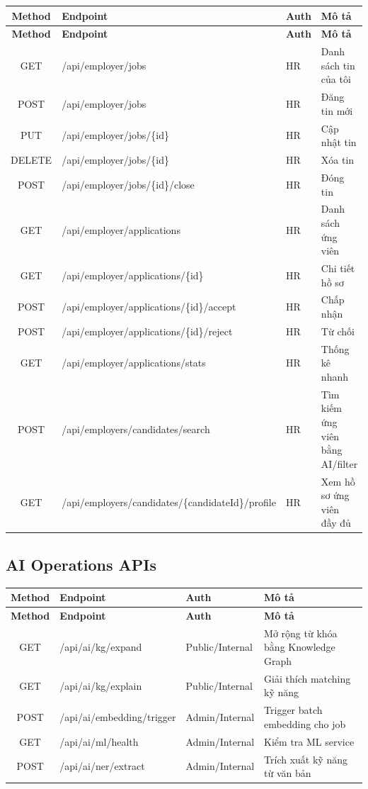 \documentclass[12pt, a4paper]{report}
\begin{document}
\begin{longtable}{|c|p{5cm}|p{2cm}|p{4cm}|}
\hline
\textbf{Method} & \textbf{Endpoint} & \textbf{Auth} & \textbf{Mô tả} \\
\hline
\endfirsthead
\hline
\textbf{Method} & \textbf{Endpoint} & \textbf{Auth} & \textbf{Mô tả} \\
\hline
\endhead
GET & /api/employer/jobs & HR & Danh sách tin của tôi \\
\hline
POST & /api/employer/jobs & HR & Đăng tin mới \\
\hline
PUT & /api/employer/jobs/\{id\} & HR & Cập nhật tin \\
\hline
DELETE & /api/employer/jobs/\{id\} & HR & Xóa tin \\
\hline
POST & /api/employer/jobs/\{id\}/close & HR & Đóng tin \\
\hline
GET & /api/employer/applications & HR & Danh sách ứng viên \\
\hline
GET & /api/employer/applications/\{id\} & HR & Chi tiết hồ sơ \\
\hline
POST & /api/employer/applications/\{id\}/accept & HR & Chấp nhận \\
\hline
POST & /api/employer/applications/\{id\}/reject & HR & Từ chối \\
\hline
GET & /api/employer/applications/stats & HR & Thống kê nhanh \\
\hline
POST & /api/employers/candidates/search & HR & Tìm kiếm ứng viên bằng AI/filter \\
\hline
GET & /api/employers/candidates/\{candidateId\}/profile & HR & Xem hồ sơ ứng viên đầy đủ \\
\hline
\end{longtable}

\subsection{AI Operations APIs}

\begin{longtable}{|c|p{5cm}|p{2cm}|p{4cm}|}
\hline
\textbf{Method} & \textbf{Endpoint} & \textbf{Auth} & \textbf{Mô tả} \\
\hline
\endfirsthead
\hline
\textbf{Method} & \textbf{Endpoint} & \textbf{Auth} & \textbf{Mô tả} \\
\hline
\endhead
GET & /api/ai/kg/expand & Public/Internal & Mở rộng từ khóa bằng Knowledge Graph \\
\hline
GET & /api/ai/kg/explain & Public/Internal & Giải thích matching kỹ năng \\
\hline
POST & /api/ai/embedding/trigger & Admin/Internal & Trigger batch embedding cho job \\
\hline
GET & /api/ai/ml/health & Admin/Internal & Kiểm tra ML service \\
\hline
POST & /api/ai/ner/extract & Admin/Internal & Trích xuất kỹ năng từ văn bản \\
\hline
\end{longtable}
\end{document}
